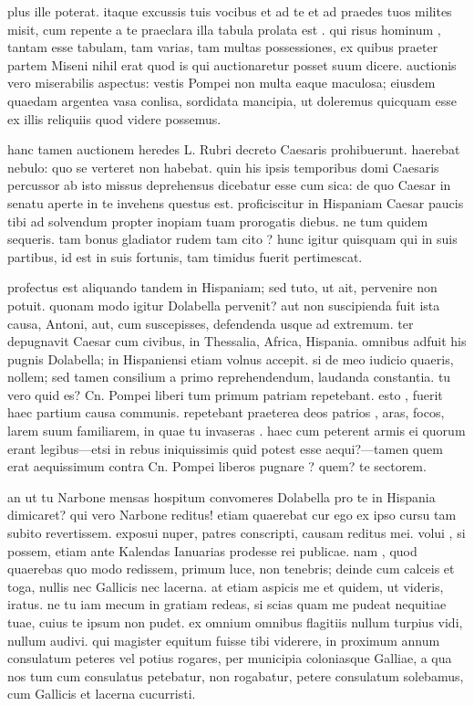  plus ille poterat. itaque excussis tuis vocibus et ad te et ad praedes tuos milites misit, cum repente a te praeclara illa tabula prolata est . qui risus hominum , tantam esse tabulam, tam varias, tam multas possessiones, ex quibus praeter partem Miseni nihil erat quod is qui auctionaretur posset suum dicere. auctionis vero miserabilis aspectus: vestis Pompei non multa eaque maculosa; eiusdem quaedam argentea vasa conlisa, sordidata mancipia, ut doleremus quicquam esse ex illis reliquiis quod videre possemus.

 hanc tamen auctionem heredes L. Rubri decreto Caesaris prohibuerunt. haerebat nebulo: quo se verteret non habebat. quin his ipsis temporibus domi Caesaris percussor ab isto missus deprehensus dicebatur esse cum sica: de quo Caesar in senatu aperte in te invehens questus est. proficiscitur in Hispaniam Caesar paucis tibi ad solvendum propter inopiam tuam prorogatis diebus. ne tum quidem sequeris. tam bonus gladiator rudem tam cito ? hunc igitur quisquam qui in suis partibus, id est in suis fortunis, tam timidus fuerit pertimescat.

 profectus est aliquando tandem in Hispaniam; sed tuto, ut ait, pervenire non potuit. quonam modo igitur Dolabella pervenit? aut non suscipienda fuit ista causa, Antoni, aut, cum suscepisses, defendenda usque ad extremum. ter depugnavit Caesar cum civibus, in Thessalia, Africa, Hispania. omnibus adfuit his pugnis Dolabella; in Hispaniensi etiam volnus accepit. si de meo iudicio quaeris, nollem; sed tamen consilium a primo reprehendendum, laudanda constantia. tu vero quid es? Cn. Pompei liberi tum primum patriam repetebant. esto , fuerit haec partium causa communis. repetebant praeterea deos patrios , aras, focos, larem suum familiarem, in quae tu invaseras . haec cum peterent armis ei quorum erant legibus—etsi in rebus iniquissimis quid potest esse aequi?—tamen quem erat aequissimum contra Cn. Pompei liberos pugnare ? quem? te sectorem.

 an ut tu Narbone mensas hospitum convomeres Dolabella pro te in Hispania dimicaret? qui vero Narbone reditus! etiam quaerebat cur ego ex ipso cursu tam subito revertissem. exposui nuper, patres conscripti, causam reditus mei. volui , si possem, etiam ante Kalendas Ianuarias prodesse rei publicae. nam , quod quaerebas quo modo redissem, primum luce, non tenebris; deinde cum calceis et toga, nullis nec Gallicis nec lacerna. at etiam aspicis me et quidem, ut videris, iratus. ne tu iam mecum in gratiam redeas, si scias quam me pudeat nequitiae tuae, cuius te ipsum non pudet. ex omnium omnibus flagitiis nullum turpius vidi, nullum audivi. qui magister equitum fuisse tibi viderere, in proximum annum consulatum peteres vel potius rogares, per municipia coloniasque Galliae, a qua nos tum cum consulatus petebatur, non rogabatur, petere consulatum solebamus, cum Gallicis et lacerna cucurristi.

